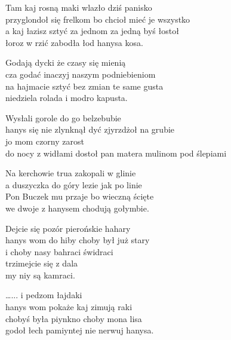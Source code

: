 \begin{text}
    Tam kaj rosną maki wlazło dziś panisko\\
    przyglondoł się frelkom bo chcioł mieć je wszystko\\
    a kaj łazisz sztyć za jednom za jedną byś łostoł\\
    łoroz w rzić zabodła łod hanysa kosa.

    Godają dycki że czasy się mienią\\
    cza godać inaczyj naszym podniebieniom\\
    na hajmacie sztyć bez zmian te same gusta\\
    niedziela rolada i modro kapusta.

    Wysłali gorole do go belzebubie\\
    hanys się nie zlynknął dyć zjyrzdżoł na grubie\\
    jo mom czorny zarost\\
    do nocy z widłami dostoł pan matera mulinom pod ślepiami

    Na kerchowie trua zakopali w glinie\\
    a duszyczka do góry lezie jak po linie\\
    Pon Buczek mu przaje bo wieczną ścięte\\
    we dwoje z hanysem chodują gołymbie.

    Dejcie się pozór pierońskie hahary\\
    hanys wom do hiby choby był już stary\\
    i choby nasy bahraci świdraci\\
    trzimejcie się z dala\\
    my niy są kamraci.

    …... i pedzom łajdaki\\
    hanys wom pokaże kaj zimują raki\\
    chobyś była piynkno choby mona lisa\\
    godoł łech pamiyntej nie nerwuj hanysa.
\end{text}
\begin{chord}

\end{chord}